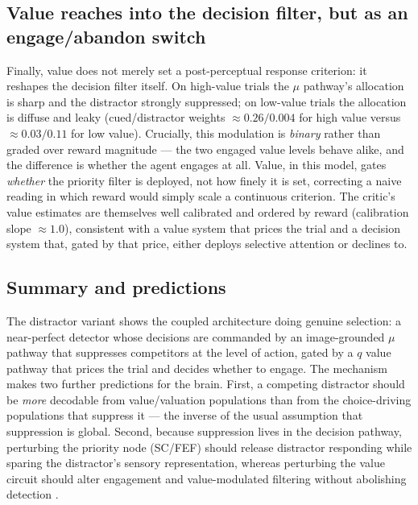 \subsection{Value reaches into the decision filter, but as an engage/abandon switch}
Finally, value does not merely set a post-perceptual response criterion: it reshapes
the decision filter itself. On high-value trials the $\mu$ pathway's allocation is
sharp and the distractor strongly suppressed; on low-value trials the allocation is
diffuse and leaky (cued/distractor weights $\approx 0.26/0.004$ for high value versus
$\approx 0.03/0.11$ for low value). Crucially, this modulation is \emph{binary} rather
than graded over reward magnitude --- the two engaged value levels behave alike, and
the difference is whether the agent engages at all. Value, in this model, gates
\emph{whether} the priority filter is deployed, not how finely it is set, correcting a
naive reading in which reward would simply scale a continuous criterion. The critic's
value estimates are themselves well calibrated and ordered by reward
(calibration slope $\approx 1.0$), consistent with a value system that prices the trial
and a decision system that, gated by that price, either deploys selective attention or
declines to.

\subsection{Summary and predictions}
The distractor variant shows the coupled architecture doing genuine selection: a
near-perfect detector whose decisions are commanded by an image-grounded $\mu$ pathway
that suppresses competitors at the level of action, gated by a $q$ value pathway that
prices the trial and decides whether to engage. The mechanism makes two further
predictions for the brain. First, a competing distractor should be \emph{more}
decodable from value/valuation populations than from the choice-driving populations
that suppress it --- the inverse of the usual assumption that suppression is global.
Second, because suppression lives in the decision pathway, perturbing the priority
node (SC/FEF) should release distractor responding while sparing the distractor's
sensory representation, whereas perturbing the value circuit should alter engagement
and value-modulated filtering without abolishing detection
\citep{zenon2012attention, herman2018gain, gregoriou2012lesions}.
